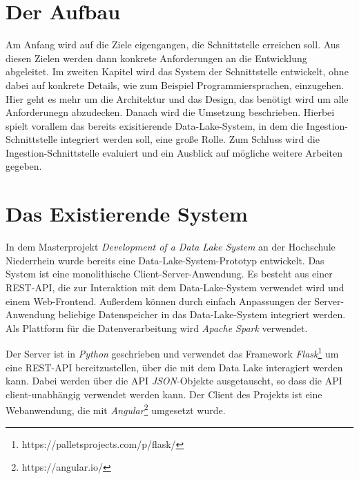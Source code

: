 \section{Der Aufbau}
Am Anfang wird auf die Ziele eigengangen, die Schnittstelle erreichen soll.
Aus diesen Zielen werden dann konkrete Anforderungen an die Entwicklung abgeleitet.
Im zweiten Kapitel wird das System der Schnittstelle entwickelt, ohne dabei auf konkrete Details, wie zum Beispiel Programmiersprachen, einzugehen.
Hier geht es mehr um die Architektur und das Design, das benötigt wird um alle Anforderunegn abzudecken.
Danach wird die Umsetzung beschrieben.
Hierbei spielt vorallem das bereits exisitierende Data-Lake-System, in dem die Ingestion-Schnittstelle integriert werden soll, eine große Rolle.
Zum Schluss wird die Ingestion-Schnittstelle evaluiert und ein Ausblick auf mögliche weitere Arbeiten gegeben.





\section{Das Existierende System}
In dem Masterprojekt \textit{Development of a Data Lake System} \parencite{datalake_proj} an der Hochschule Niederrhein wurde bereits eine Data-Lake-System-Prototyp entwickelt.
Das System ist eine monolithische Client-Server-Anwendung.
Es besteht aus einer REST-API, die zur Interaktion mit dem Data-Lake-System verwendet wird und einem Web-Frontend.
Außerdem können durch einfach Anpassungen der Server-Anwendung beliebige Datenspeicher in das Data-Lake-System integriert werden.
Als Plattform für die Datenverarbeitung wird \textit{Apache Spark} verwendet.

Der Server ist in \textit{Python} geschrieben und verwendet das Framework \textit{Flask}\footnote{https://palletsprojects.com/p/flask/} um eine REST-API bereitzustellen, über die mit dem Data Lake interagiert werden kann.
Dabei werden über die API \textit{JSON}-Objekte ausgetauscht, so dass die API client-unabhängig verwendet werden kann.
Der Client des Projekts ist eine Webanwendung, die mit \textit{Angular}\footnote{https://angular.io/} umgesetzt wurde.

